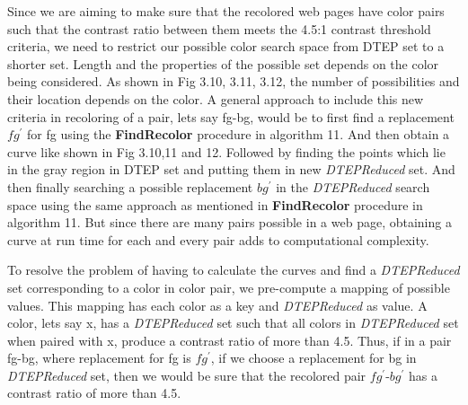 Since we are aiming to make sure that the recolored web pages have color pairs such that the contrast ratio between them meets the 4.5:1 contrast threshold criteria, we need to restrict our possible color search space from DTEP set to a shorter set. Length and the properties of the possible set depends on the color being considered. As shown in Fig 3.10, 3.11, 3.12, the number of possibilities and their location depends on the color. A general approach to include this new criteria in recoloring of a pair, lets say fg-bg, would be to first find a replacement $fg^{\prime}$ for fg using the \textbf{FindRecolor} procedure in algorithm 11. And then obtain a curve like shown in Fig 3.10,11 and 12. Followed by finding the points which lie in the gray region in DTEP set and putting them in new \textit{DTEPReduced} set. And then finally searching a possible replacement $bg^{\prime}$ in the \textit{DTEPReduced} search space using the same approach as mentioned in \textbf{FindRecolor} procedure in algorithm 11. But since there are many pairs possible in a web page, obtaining a curve at run time for each and every pair adds to computational complexity. 

To resolve the problem of having to calculate the curves and find a \textit{DTEPReduced} set corresponding to a color in color pair, we pre-compute a mapping of possible values. This mapping has each color as a key and \textit{DTEPReduced} as value. A color, lets say x, has a \textit{DTEPReduced} set such that all colors in \textit{DTEPReduced} set when paired with x, produce a contrast ratio of more than 4.5. Thus, if in a pair fg-bg, where replacement for fg is $fg^{\prime}$, if we choose a replacement for bg in \textit{DTEPReduced} set, then we would be sure that the recolored pair $fg^{\prime}$-$bg^{\prime}$ has a contrast ratio of more than 4.5.

